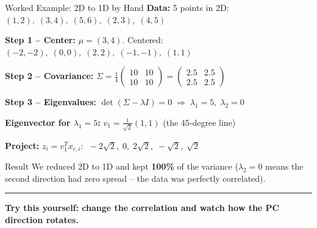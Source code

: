 \documentclass[8pt,aspectratio=169]{beamer}
\newcommand{\bottomnote}[1]{%
\vfill
\vspace{-2mm}
\textcolor{mllavender2}{\rule{\textwidth}{0.4pt}}
\vspace{1mm}
\footnotesize
\textbf{#1}
}
\newcommand{\highlight}[1]{\textcolor{mlorange}{\textbf{#1}}}
\begin{document}
\begin{frame}[t]{Worked Example: 2D to 1D by Hand}
\small
\textbf{Data:} 5 points in 2D: $(1,2),\;(3,4),\;(5,6),\;(2,3),\;(4,5)$

\vspace{1mm}
\textbf{Step 1 -- Center:} $\mu = (3, 4)$. Centered: $(-2,-2),\;(0,0),\;(2,2),\;(-1,-1),\;(1,1)$

\vspace{1mm}
\textbf{Step 2 -- Covariance:}
$\Sigma = \frac{1}{4}\begin{pmatrix} 10 & 10 \\ 10 & 10 \end{pmatrix} = \begin{pmatrix} 2.5 & 2.5 \\ 2.5 & 2.5 \end{pmatrix}$

\vspace{1mm}
\textbf{Step 3 -- Eigenvalues:} $\det(\Sigma - \lambda I) = 0 \;\Rightarrow\; \lambda_1 = 5,\;\lambda_2 = 0$

\vspace{1mm}
\textbf{Eigenvector for $\lambda_1 = 5$:} $v_1 = \frac{1}{\sqrt{2}}(1, 1)$ \;(the 45-degree line)

\vspace{1mm}
\textbf{Project:} $z_i = v_1^T x_{c,i}$: $\;-2\sqrt{2},\;0,\;2\sqrt{2},\;-\sqrt{2},\;\sqrt{2}$

\vspace{2mm}
\begin{block}{Result}
\small We reduced 2D to 1D and kept \highlight{100\%} of the variance ($\lambda_2 = 0$ means the second direction had zero spread -- the data was perfectly correlated).
\end{block}

\bottomnote{Try this yourself: change the correlation and watch how the PC direction rotates.}
\end{frame}
\end{document}

